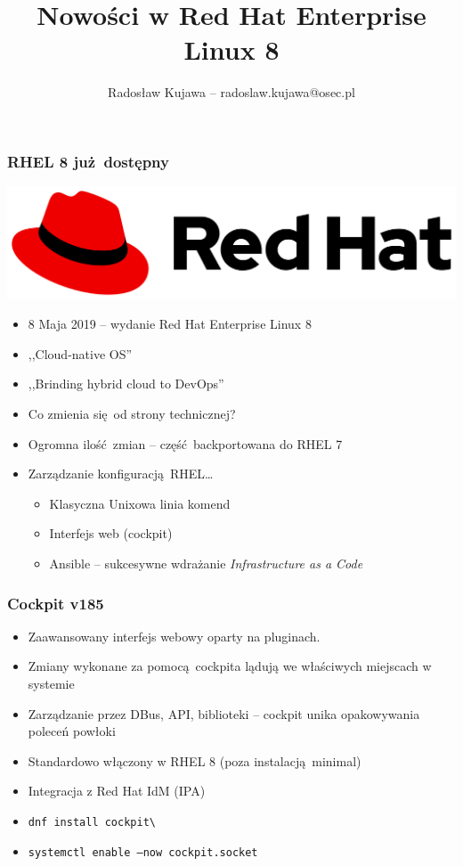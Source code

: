 \documentclass[dvipsnames,table]{beamer}
\title{Nowości w Red Hat Enterprise Linux 8}
\author{Radosław Kujawa -- radoslaw.kujawa@osec.pl}
\institute{OSEC}
\begin{document}
\begin{frame}
	\titlepage
\end{frame}

\begin{frame}
\frametitle{RHEL 8 już dostępny}
\begin{center}
\includegraphics[scale=0.1]{img-rhlogo.png}
\end{center}
\begin{itemize}
	\item 8 Maja 2019 -- wydanie Red Hat Enterprise Linux 8
	\item ,,Cloud-native OS''
	\item ,,Brinding hybrid cloud to DevOps''
	\item Co zmienia się od strony technicznej?
	\item Ogromna ilość zmian -- część backportowana do RHEL 7
	\item Zarządzanie konfiguracją RHEL\ldots
	\begin{itemize}
		\item Klasyczna Unixowa linia komend
		\item Interfejs web (cockpit)
		\item Ansible -- sukcesywne wdrażanie {\em Infrastructure as a Code}
	\end{itemize}
\end{itemize}
\begin{center}
\end{center}
\end{frame}

\begin{frame}
\frametitle{Cockpit v185}
\begin{itemize}
	\item Zaawansowany interfejs webowy oparty na pluginach.
	\item Zmiany wykonane za pomocą cockpita lądują we właściwych miejscach w systemie
	\item Zarządzanie przez DBus, API, biblioteki -- cockpit unika opakowywania poleceń powłoki
	\item Standardowo włączony w RHEL 8 (poza instalacją minimal)
	\item Integracja z Red Hat IdM (IPA)
	\item {\tt dnf install cockpit\textbackslash* }
	\item {\tt systemctl enable --now cockpit.socket}
\end{itemize}
\begin{center}
\end{center}
\end{frame}
\end{document}
